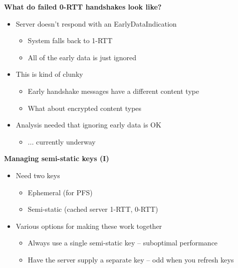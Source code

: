 \documentclass[helvetica]{seminar}
\newcommand{\heading}[1]{%
  \begin{center} 
    \large\bf 
    #1 
  \end{center} 
  \vspace{.4 in}}
\begin{document}
\begin{slide}
\heading{What do failed 0-RTT handshakes look like?}

\begin{itemize}
\item Server doesn't respond with an EarlyDataIndication
  \begin{itemize}
  \item System falls back to 1-RTT
  \item All of the early data is just ignored
  \end{itemize}

\item This is kind of clunky
  \begin{itemize}
  \item Early handshake messages have a different content type
  \item What about encrypted content types
  \end{itemize}

\item Analysis needed that ignoring early data is OK
  \begin{itemize}
  \item ... currently underway
  \end{itemize}
\end{itemize}

\end{slide}



\begin{slide}
\heading{Managing semi-static keys (I)}

\begin{itemize}
\item Need two keys
  \begin{itemize}
  \item Ephemeral (for PFS)
  \item Semi-static (cached server 1-RTT, 0-RTT)
  \end{itemize}

\item Various options for making these work together
  \begin{itemize}
  \item Always use a single semi-static key -- suboptimal performance
  \item Have the server supply a separate key -- odd when you refresh keys
  \end{itemize}
\end{itemize}
\end{slide}
\end{document}
